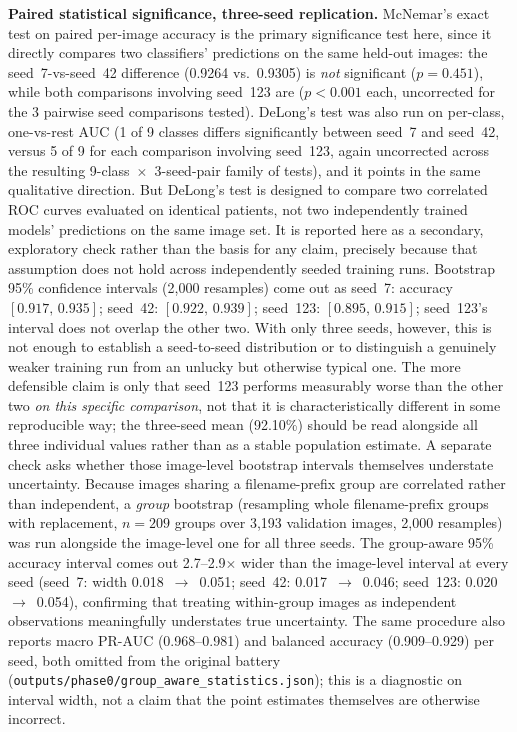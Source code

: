 \textbf{Paired statistical significance, three-seed replication.} McNemar's exact test \cite{ref49} on paired per-image accuracy is the primary significance test here, since it directly compares two classifiers' predictions on the same held-out images: the seed~7-vs-seed~42 difference (0.9264 vs.\ 0.9305) is \textit{not} significant ($p=0.451$), while both comparisons involving seed~123 are ($p<0.001$ each, uncorrected for the 3 pairwise seed comparisons tested). DeLong's test \cite{ref47} was also run on per-class, one-vs-rest AUC (1 of 9 classes differs significantly between seed~7 and seed~42, versus 5 of 9 for each comparison involving seed~123, again uncorrected across the resulting 9-class~$\times$~3-seed-pair family of tests), and it points in the same qualitative direction. But DeLong's test is designed to compare two correlated ROC curves evaluated on identical patients, not two independently trained models' predictions on the same image set. It is reported here as a secondary, exploratory check rather than the basis for any claim, precisely because that assumption does not hold across independently seeded training runs. Bootstrap 95\% confidence intervals \cite{ref48} (2,000 resamples) come out as seed~7: accuracy $[0.917,\,0.935]$; seed~42: $[0.922,\,0.939]$; seed~123: $[0.895,\,0.915]$; seed~123's interval does not overlap the other two. With only three seeds, however, this is not enough to establish a seed-to-seed distribution or to distinguish a genuinely weaker training run from an unlucky but otherwise typical one. The more defensible claim is only that seed~123 performs measurably worse than the other two \textit{on this specific comparison}, not that it is characteristically different in some reproducible way; the three-seed mean (92.10\%) should be read alongside all three individual values rather than as a stable population estimate. A separate check asks whether those image-level bootstrap intervals themselves understate uncertainty. Because images sharing a filename-prefix group are correlated rather than independent, a \textit{group} bootstrap (resampling whole filename-prefix groups with replacement, $n=209$ groups over 3,193 validation images, 2,000 resamples) was run alongside the image-level one for all three seeds. The group-aware 95\% accuracy interval comes out 2.7--2.9$\times$ wider than the image-level interval at every seed (seed~7: width 0.018~$\rightarrow$~0.051; seed~42: 0.017~$\rightarrow$~0.046; seed~123: 0.020~$\rightarrow$~0.054), confirming that treating within-group images as independent observations meaningfully understates true uncertainty. The same procedure also reports macro PR-AUC (0.968--0.981) and balanced accuracy (0.909--0.929) per seed, both omitted from the original battery (\texttt{outputs/phase0/group\_aware\_statistics.json}); this is a diagnostic on interval width, not a claim that the point estimates themselves are otherwise incorrect.

